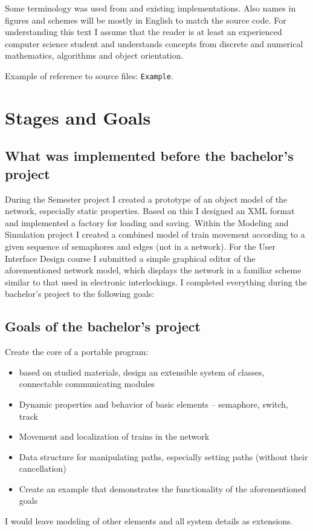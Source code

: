 \documentclass[english]{cls/fitthesis}
\newcommand{\cfr}[1]{\texttt{#1}}
\newcommand{\sourceRef}[1]{\cfr{#1}}
\begin{document}
Some terminology was used from \cite{z173_1995sb} and existing implementations.
Also names in figures and schemes will be mostly in English to match the source code.
For understanding this text I assume that the reader is at least an experienced computer science student
and understands concepts from discrete and numerical mathematics, algorithms and object orientation.

Example of reference to source files: \sourceRef{Example}.
\section{Stages and Goals}

    \subsection*{What was implemented before the bachelor's project}
    During the Semester project I created a prototype of an object model of the network, especially static properties.
    Based on this I designed an XML format and implemented a factory for loading and saving.
    Within the Modeling and Simulation project I created a combined model of train movement
    according to a given sequence of semaphores and edges (not in a network).
    For the User Interface Design course I submitted a simple graphical editor of the aforementioned network model,
    which displays the network in a familiar scheme similar to that used in electronic interlockings.
    I completed everything during the bachelor's project to the following goals:
    \subsection*{Goals of the bachelor's project}
    Create the core of a portable program:
    \begin{itemize}
      \item based on studied materials, design an extensible system of classes, connectable communicating modules
      \item Dynamic properties and behavior of basic elements -- semaphore, switch, track
      \item Movement and localization of trains in the network
      \item Data structure for manipulating paths, especially setting paths (without their cancellation)
      \item Create an example that demonstrates the functionality of the aforementioned goals
    \end{itemize}
    I would leave modeling of other elements and all system details as extensions.
\end{document}
